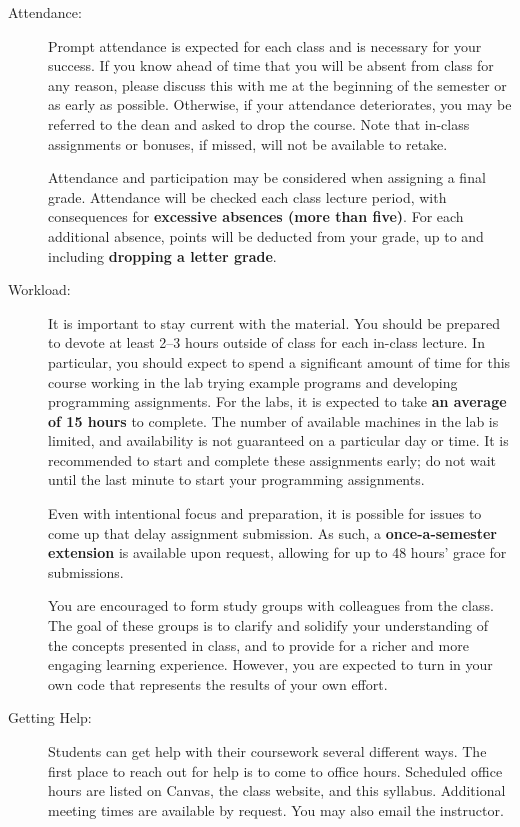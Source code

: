 \documentclass [letterpaper,11pt]{article}
\begin{document}
\begin{description}
\item[Attendance:]
Prompt attendance is expected for each class and is necessary for your success. If you know ahead of time that you will be
absent from class for any reason, please discuss this with me at the beginning of the semester
or as early as possible. Otherwise, if your attendance deteriorates, you may be referred to the dean and asked to drop the course. Note that in-class assignments or bonuses, if missed, will not be available to retake.

Attendance and participation may be considered when assigning a final grade.
Attendance will be checked each class lecture period, with consequences for \textbf{excessive absences (more than five)}.  For each additional absence, points will be deducted from your grade, up to and including \textbf{dropping a letter grade}.

\item[Workload:]
It is important to stay current with the material.  You should be prepared to devote at least 2--3 hours outside of class for each in-class lecture.  In particular, you should expect to spend a significant amount of time for this course working in the lab trying example programs and developing programming assignments. For the labs, it is expected to take \textbf{an average of 15 hours} to complete. The number of available machines in the lab is limited, and availability is not guaranteed on a particular day or time.  It is recommended to start and complete these assignments early; do not wait until the last minute to start your programming assignments. 

Even with intentional focus and preparation, it is possible for issues to come up that delay assignment submission.  As such, a \textbf{once-a-semester extension} is available upon request, allowing for up to 48 hours' grace for submissions. 

You are encouraged to form study groups with colleagues from the class. The goal of these groups is to clarify and solidify your understanding of the concepts presented in class, and to provide for a richer and more engaging learning experience. However, you are expected to turn in your own code that represents the results of your own effort.

\item[Getting Help:]
Students can get help with their coursework several different ways. The first place to
reach out for help is to come to office hours. Scheduled office hours are listed on Canvas, the class website, and this syllabus.
Additional meeting times are available by request. You may also email the instructor.


\end{description}
\end{document}
